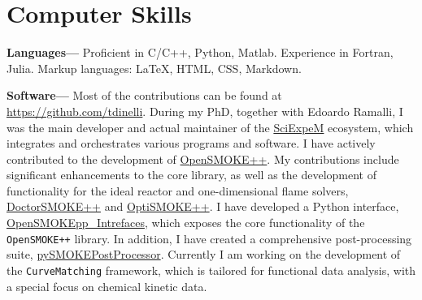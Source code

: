 \section{\sc Computer Skills}
{\bf Languages---}
Proficient in C/C++, Python, Matlab. Experience in Fortran, Julia. Markup languages:
\LaTeX, HTML, CSS, Markdown.


{\bf Software---}%
Most of the contributions can be found at \url{https://github.com/tdinelli}. During my
PhD, together with Edoardo Ramalli, I was the main developer and actual maintainer of the
\href{https://sciexpem.polimi.it/}{SciExpeM} ecosystem, which integrates and orchestrates
various programs and software. I have actively contributed to the development of
\href{https://www.opensmokepp.polimi.it/}{OpenSMOKE++}. My contributions include
significant enhancements to the core library, as well as the development of functionality
for the ideal reactor and one-dimensional flame solvers, \href{https://www.opensmokepp.polimi.it/}{DoctorSMOKE++} and
\href{https://github.com/burn-research/OptiSMOKE_toolbox}{OptiSMOKE++}. I have
developed a Python interface,
\href{https://github.com/tdinelli/OpenSMOKEpp_Interfaces}{OpenSMOKEpp\_Intrefaces}, which
exposes the core functionality of the {\tt OpenSMOKE++} library. In addition, I have
created a comprehensive post-processing suite,
\href{https://github.com/tdinelli/pySMOKEPostProcessor}{pySMOKEPostProcessor}. Currently I
am working on the development of the \texttt{CurveMatching} framework, which is tailored
for functional data analysis, with a special focus on chemical
kinetic data.


